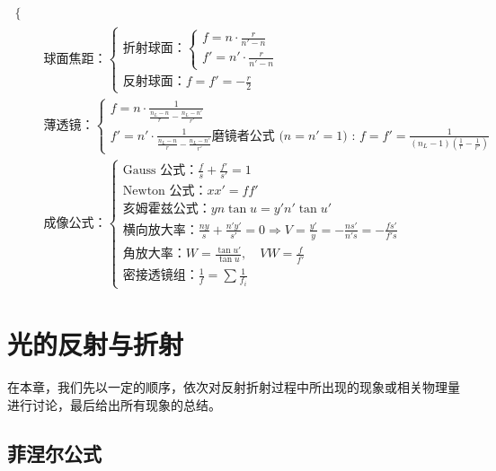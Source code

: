 \documentclass[UTF8]{report}
\theoremstyle{MyLineTheoremStyle} %
\theoremstyle{MyBlockTheoremStyle} %
\theoremstyle{MySubsubsectionStyle} %
\begin{document}
\begin{align}
\begin{cases}
\end{cases}
\\ &
\text{球面焦距：}
\begin{cases}
    \text{折射球面：}\begin{cases}
        f = n \cdot \frac{r}{n' - n} \\ 
        f' = n' \cdot \frac{r}{n' - n}
    \end{cases} \\ 
    \text{反射球面：}f = f' = - \frac{r}{2}
\end{cases}
\\ &
\text{薄透镜：}
\begin{cases}
    f = n \cdot \frac{1}{\frac{n_L - n}{r} - \frac{n_L - n'}{r'}} \\ 
    f' = n' \cdot \frac{1}{\frac{n_L - n}{r} - \frac{n_L - n'}{r'}}
    \text{磨镜者公式 ($n = n' = 1$) : }f = f' = \frac{1}{\left(n_L - 1\right)\left(\frac{1}{r} - \frac{1}{r'}\right)}
\end{cases}
\\ &
\text{成像公式：}
\begin{cases}
    \text{Gauss 公式：} \frac{f}{s} + \frac{f'}{s'} = 1 \\ 
    \text{Newton 公式：} xx' = ff'\\
    \text{亥姆霍兹公式：} yn \tan u = y'n' \tan u'\\
    \text{横向放大率：} \frac{ny}{s} + \frac{n'y'}{s'} = 0 \Longrightarrow V = \frac{y'}{y} =  - \frac{ns'}{n's}=  - \frac{fs'}{f's}\\
    \text{角放大率：} W = \frac{\tan u'}{\tan u},\quad VW = \frac{f}{f'}\\
    \text{密接透镜组：} \frac{1}{f} = \sum \frac{1}{f_i}
\end{cases}
\end{align}



\chapter{光的反射与折射}\thispagestyle{fancy}

在本章，我们先以一定的顺序，依次对反射折射过程中所出现的现象或相关物理量进行讨论，最后给出所有现象的总结。

\section{菲涅尔公式}
\end{document}
